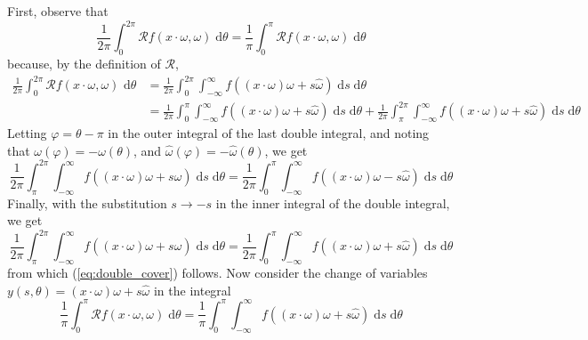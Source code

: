 \documentclass{homework}
\begin{document}
	\maketitle
	
	\question First, observe that 
	\begin{equation}\label{eq:double_cover}
		\frac{1}{2\pi}\int_0^{2\pi} \mathcal{R}f(x\cdot \omega, \omega)\;\text{d}\theta = \frac{1}{\pi}\int_0^{\pi}\mathcal{R}f(x\cdot \omega, \omega)\;\text{d}\theta
	\end{equation}
	because, by the definition of \(\mathcal{R}\),
	\begin{align*}
		\frac{1}{2\pi}\int_0^{2\pi} \mathcal{R}f(x\cdot \omega, \omega)\text{ d}\theta &= \frac{1}{2\pi}\int_0^{2\pi}\int_{-\infty}^{\infty} f((x\cdot \omega)\omega + s\widehat{\omega})\;\text{d}s\;\text{d}\theta \\
		&= \frac{1}{2\pi}\int_0^{\pi}\int_{-\infty}^{\infty} f((x\cdot \omega)\omega + s\widehat{\omega})\;\text{d}s\;\text{d}\theta + \frac{1}{2\pi}\int_\pi^{2\pi}\int_{-\infty}^{\infty} f((x\cdot \omega)\omega + s\widehat{\omega})\;\text{d}s\;\text{d}\theta
	\end{align*}
	Letting \(\varphi = \theta - \pi\) in the outer integral of the last double integral, and noting that \(\omega(\varphi) = -\omega(\theta)\), and \(\widehat{\omega}(\varphi) = -\widehat{\omega}(\theta)\), we get
	\begin{equation*}
		\frac{1}{2\pi}\int_\pi^{2\pi}\int_{-\infty}^{\infty} f((x\cdot \omega)\omega + s\widehat{\omega})\;\text{d}s\;\text{d}\theta = \frac{1}{2\pi}\int_0^{\pi}\int_{-\infty}^{\infty} f((x\cdot \omega)\omega - s\widehat{\omega})\;\text{d}s\;\text{d}\theta
	\end{equation*}
	Finally, with the substitution \(s \to -s\) in the inner integral of the double integral, we get
	\begin{equation*}
		\frac{1}{2\pi}\int_\pi^{2\pi}\int_{-\infty}^{\infty} f((x\cdot \omega)\omega + s\widehat{\omega})\;\text{d}s\;\text{d}\theta = \frac{1}{2\pi}\int_0^{\pi}\int_{-\infty}^{\infty} f((x\cdot \omega)\omega + s\widehat{\omega})\;\text{d}s\;\text{d}\theta
	\end{equation*}
	from which (\ref{eq:double_cover}) follows. Now consider the change of variables \(y(s, \theta) = (x\cdot\omega)\omega + s\widehat{\omega}\) in the integral
	\begin{equation}\label{eq:single_cover}
		\frac{1}{\pi}\int_0^{\pi}\mathcal{R}f(x\cdot \omega, \omega)\;\text{d}\theta = \frac{1}{\pi}\int_0^{\pi}\int_{-\infty}^{\infty} f((x\cdot \omega)\omega + s\widehat{\omega})\;\text{d}s\;\text{d}\theta
	\end{equation}
\end{document}
